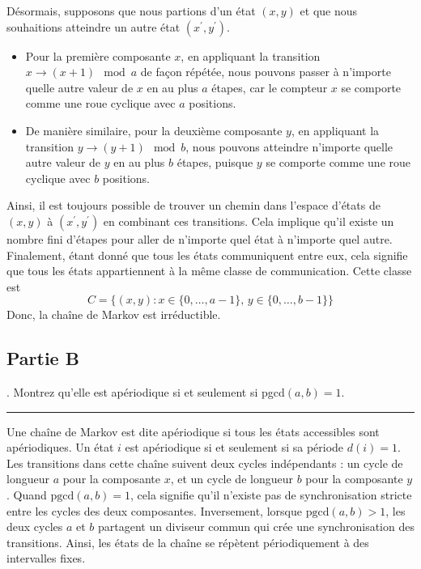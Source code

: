 \documentclass{article}
\begin{document}
Désormais, supposons que nous partions d'un état $(x,y)$ et que nous souhaitions 
atteindre un autre état $(x^\prime,y^\prime)$. 
\begin{itemize}
    \item Pour la première composante $x$, en appliquant la transition 
    $x \to (x+1)\mod a$ de façon répétée, nous pouvons passer à n'importe quelle 
    autre valeur de $x$ en au plus $a$ étapes, car le compteur $x$ se comporte 
    comme une roue cyclique avec $a$ positions.
    \item De manière similaire, pour la deuxième composante $y$, en appliquant la 
    transition $y \to (y+1)\mod b$, nous pouvons atteindre n'importe quelle autre 
    valeur de $y$ en au plus $b$ étapes, puisque $y$ se comporte comme une roue 
    cyclique avec $b$ positions.
\end{itemize}
Ainsi, il est toujours possible de trouver un chemin dans l'espace d'états de 
$(x,y)$ à $(x^\prime,y^\prime)$ en combinant ces transitions. Cela implique qu'il 
existe un nombre fini d'étapes pour aller de n'importe quel état à n'importe 
quel autre. \\

Finalement, étant donné que tous les états communiquent entre eux, cela signifie 
que tous les états appartiennent à la même classe de communication. Cette classe est
\[
    C = \{(x,y):x\in\{0,\dots,a-1\},\,y\in\{0,\dots,b-1\}\}
\]
Donc, la chaîne de Markov est irréductible.

\newpage
\subsection*{Partie B}
. Montrez qu'elle est apériodique si et seulement si pgcd$(a,b)=1$.
\vspace{.2cm}
\hrule
\vspace{.4cm}
Une chaîne de Markov est dite apériodique si tous les états accessibles sont
apériodiques. Un état $i$ est apériodique si et seulement si sa période $d(i)=1$. \\

\noindent Les transitions dans cette chaîne suivent deux cycles indépendants : un cycle 
de longueur \(a\) pour la composante \(x\), et un cycle de longueur \(b\) pour la composante 
\(y\). Quand \( \text{pgcd}(a, b) = 1 \), cela signifie qu'il n'existe pas de synchronisation 
stricte entre les cycles des deux composantes. Inversement, lorsque \( \text{pgcd}(a, b) > 1 \), 
les deux cycles \(a\) et \(b\) partagent un diviseur commun qui crée une synchronisation 
des transitions. Ainsi, les états de la chaîne se répètent périodiquement à des intervalles 
fixes.
\end{document}
